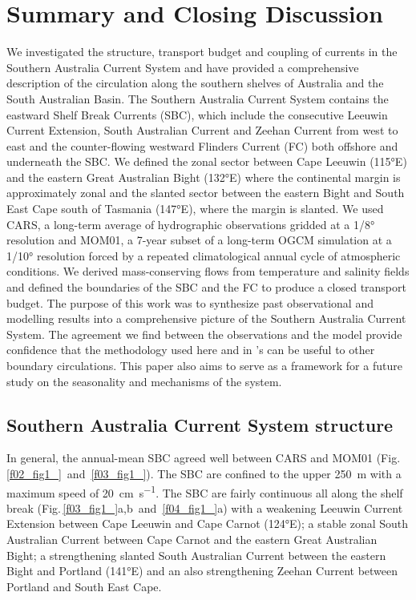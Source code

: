 \documentclass[preprint,3p,review,12pt]{elsarticle}
\newcommand{\citepos}[1]{\citeauthor{#1}'s \citeyearpar{#1}}
\begin{document}
\section{Summary and Closing Discussion}\label{Summary}
We investigated the structure, transport budget and coupling of currents in the Southern Australia Current System and have provided a comprehensive
description
of the circulation along the southern shelves of Australia and the South Australian Basin. The Southern Australia Current System contains the eastward Shelf Break Currents (SBC),
which include the consecutive Leeuwin Current Extension, South Australian Current and Zeehan Current from west to east and the counter-flowing westward Flinders Current (FC) both offshore and underneath the SBC\@.
We defined the zonal sector between Cape Leeuwin (\ang{115}E) and the eastern Great Australian Bight (\ang{132}E) where the continental margin is approximately zonal 
and the slanted sector between the eastern Bight and South East Cape south of Tasmania (\ang{147}E),
where the margin is slanted. We used CARS, a long-term average of hydrographic observations gridded at a 1/\ang{8} resolution
and MOM01, a 7-year
subset of a long-term OGCM simulation
at a 1/\ang{10} resolution
forced by a repeated climatological annual cycle of
atmospheric conditions.
We derived mass-conserving flows from temperature and salinity fields and defined the boundaries of the SBC and the FC to produce a closed transport budget. The purpose of this work was to
synthesize past observational and modelling results into a comprehensive picture
of the Southern Australia Current System. The agreement we find between the observations and the model provide confidence that the methodology used here and in \citepos{Furue2017} can be useful to other boundary circulations. This paper also aims to serve as a framework for a future study on the seasonality and mechanisms of the system. 

\subsection{Southern Australia Current System structure}
In general, the annual-mean SBC agreed well between CARS and MOM01 (Fig.\,\ref{f02_fig1_}~and~\ref{f03_fig1_}). The SBC are confined to
 the upper \SI{250}{m} with a maximum speed of \SI{20}{cm.s^{-1}}.
The SBC are fairly continuous all along the shelf break
(Fig.\,\ref{f03_fig1_}a,b~and~\ref{f04_fig1_}a)
with a weakening Leeuwin Current Extension between Cape Leeuwin and Cape Carnot (\ang{124}E); a stable zonal South Australian Current between Cape Carnot and the eastern Great Australian Bight; a strengthening slanted South Australian Current between the eastern Bight and Portland (\ang{141}E) and an also strengthening Zeehan Current between Portland and South East Cape.
\end{document}
